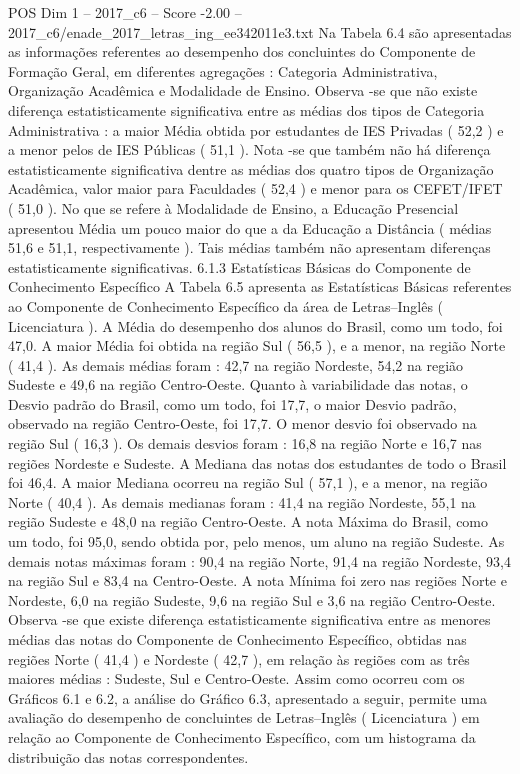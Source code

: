 \begin{textsample}{POS Dim 1 – 2017\_c6 – Score -2.00 – 2017\_c6/enade\_2017\_letras\_ing\_ee342011e3.txt}
Na Tabela 6.4 são apresentadas as informações referentes ao desempenho dos concluintes do Componente de Formação Geral, em diferentes agregações : Categoria Administrativa, Organização Acadêmica e Modalidade de Ensino.
Observa -se que não existe diferença estatisticamente significativa entre as médias dos tipos de Categoria Administrativa : a maior Média obtida por estudantes de IES Privadas ( 52,2 ) e a menor pelos de IES Públicas ( 51,1 ).
Nota -se que também não há diferença estatisticamente significativa dentre as médias dos quatro tipos de Organização Acadêmica, valor maior para Faculdades ( 52,4 ) e menor para os CEFET/IFET ( 51,0 ).
No que se refere à Modalidade de Ensino, a Educação Presencial apresentou Média um pouco maior do que a da Educação a Distância ( médias 51,6 e 51,1, respectivamente ).
Tais médias também não apresentam diferenças estatisticamente significativas. 6.1.3 Estatísticas Básicas do Componente de Conhecimento Específico A Tabela 6.5 apresenta as Estatísticas Básicas referentes ao Componente de Conhecimento Específico da área de Letras–Inglês ( Licenciatura ).
A Média do desempenho dos alunos do Brasil, como um todo, foi 47,0.
A maior Média foi obtida na região Sul ( 56,5 ), e a menor, na região Norte ( 41,4 ).
As demais médias foram : 42,7 na região Nordeste, 54,2 na região Sudeste e 49,6 na região Centro-Oeste.
Quanto à variabilidade das notas, o Desvio padrão do Brasil, como um todo, foi 17,7, o maior Desvio padrão, observado na região Centro-Oeste, foi 17,7.
O menor desvio foi observado na região Sul ( 16,3 ).
Os demais desvios foram : 16,8 na região Norte e 16,7 nas regiões Nordeste e Sudeste.
A Mediana das notas dos estudantes de todo o Brasil foi 46,4.
A maior Mediana ocorreu na região Sul ( 57,1 ), e a menor, na região Norte ( 40,4 ).
As demais medianas foram : 41,4 na região Nordeste, 55,1 na região Sudeste e 48,0 na região Centro-Oeste.
A nota Máxima do Brasil, como um todo, foi 95,0, sendo obtida por, pelo menos, um aluno na região Sudeste.
As demais notas máximas foram : 90,4 na região Norte, 91,4 na região Nordeste, 93,4 na região Sul e 83,4 na Centro-Oeste.
A nota Mínima foi zero nas regiões Norte e Nordeste, 6,0 na região Sudeste, 9,6 na região Sul e 3,6 na região Centro-Oeste.
Observa -se que existe diferença estatisticamente significativa entre as menores médias das notas do Componente de Conhecimento Específico, obtidas nas regiões Norte ( 41,4 ) e Nordeste ( 42,7 ), em relação às regiões com as três maiores médias : Sudeste, Sul e Centro-Oeste.
Assim como ocorreu com os Gráficos 6.1 e 6.2, a análise do Gráfico 6.3, apresentado a seguir, permite uma avaliação do desempenho de concluintes de Letras–Inglês ( Licenciatura ) em relação ao Componente de Conhecimento Específico, com um histograma da distribuição das notas correspondentes.

\end{textsample}
